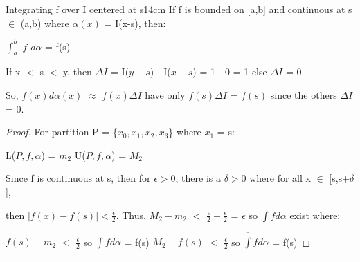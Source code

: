     \vspace{0.5cm}



    \begin{wtheorem}{Integrating f over I centered at s}{14cm}
        If f is bounded on [a,b] and continuous at s $\in$ (a,b) where
        $\alpha(x)$ = I(x-s), then:

        \hspace{0.5cm}
        $\int_a^b$ $f$ $d\alpha$ = f(s)
    \end{wtheorem}

    \begin{intuition}
        If x $<$ s $<$ y, then $\Delta I$ = I($y-s$) - I($x-s$) = 1 - 0 = 1
        else $\Delta I$ = 0.

        So, $f(x) d\alpha(x)$ $\approx$ $f(x) \Delta I$
        have only $f(s) \Delta I$ = $f(s)$ since the others $\Delta I$ = 0.
    \end{intuition}

    \vspace{0.1cm}
    
    \begin{proof}
        For partition P = \{$x_0,x_1,x_2,x_3$\} where $x_1$ = s:

        \hspace{0.5cm}
        L($P,f,\alpha$) = $m_2$
        \hspace{1cm}
        U($P,f,\alpha$) = $M_2$

        Since f is continuous at s, then for $\epsilon > 0$, there is a $\delta > 0$
        where for all x $\in$ [s,s+$\delta$],
        
        then $|f(x)-f(s)| < \frac{\epsilon}{2}$.
        Thus, $M_2 - m_2$ $<$ $\frac{\epsilon}{2} + \frac{\epsilon}{2}$
        = $\epsilon$ so $\int f d\alpha$ exist where:

        \hspace{0.5cm}
        $f(s) - m_2$ $<$ $\frac{\epsilon}{2}$
        so $\underline{\int} f d\alpha$ = f(s)
        \hspace{1cm}
        $M_2 - f(s)$ $<$ $\frac{\epsilon}{2}$
        so $\overline{\int} f d\alpha$ = f(s)
    \end{proof}

    

